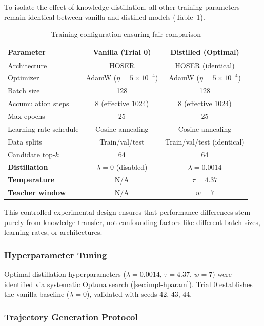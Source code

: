 To isolate the effect of knowledge distillation, all other training parameters remain identical between vanilla and distilled models (Table~\ref{tab:fair-comparison}).

\begin{table}[h]
\centering
\caption{Training configuration ensuring fair comparison}
\label{tab:fair-comparison}
\small
\begin{tabular}{lcc}
\toprule
\textbf{Parameter} & \textbf{Vanilla (Trial 0)} & \textbf{Distilled (Optimal)} \\
\midrule
Architecture & HOSER & HOSER (identical) \\
Optimizer & AdamW ($\eta = 5 \times 10^{-4}$) & AdamW ($\eta = 5 \times 10^{-4}$) \\
Batch size & 128 & 128 \\
Accumulation steps & 8 (effective 1024) & 8 (effective 1024) \\
Max epochs & 25 & 25 \\
Learning rate schedule & Cosine annealing & Cosine annealing \\
Data splits & Train/val/test & Train/val/test (identical) \\
Candidate top-$k$ & 64 & 64 \\
\midrule
\textbf{Distillation} & $\lambda = 0$ (disabled) & $\lambda = 0.0014$ \\
\textbf{Temperature} & N/A & $\tau = 4.37$ \\
\textbf{Teacher window} & N/A & $w = 7$ \\
\bottomrule
\end{tabular}
\end{table}

This controlled experimental design ensures that performance differences stem purely from knowledge transfer, not confounding factors like different batch sizes, learning rates, or architectures.

\subsubsection{Hyperparameter Tuning}

Optimal distillation hyperparameters ($\lambda = 0.0014$, $\tau = 4.37$, $w = 7$) were identified via systematic Optuna search (\autoref{sec:impl-hparam}). Trial 0 establishes the vanilla baseline ($\lambda = 0$), validated with seeds 42, 43, 44.

\subsubsection{Trajectory Generation Protocol}

